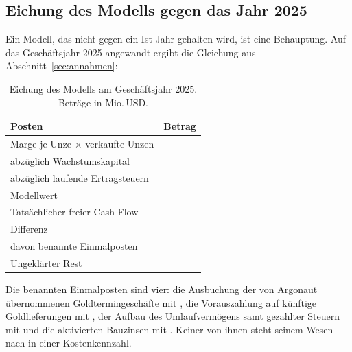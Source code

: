 \subsection{Eichung des Modells gegen das Jahr 2025}
\label{sec:eichung}

Ein Modell, das nicht gegen ein Ist-Jahr gehalten wird, ist eine Behauptung.
Auf das Gesch\"aftsjahr 2025 angewandt ergibt die Gleichung aus
Abschnitt~\ref{sec:annahmen}:

\begin{table}[htbp]
\centering
\caption{Eichung des Modells am Gesch\"aftsjahr 2025. Betr\"age in Mio.\,USD.}
\label{tab:floweichung}
\begin{tabular}{lr}
\toprule
Posten & Betrag\\
\midrule
Marge je Unze $\times$ verkaufte Unzen & \MioUSDexakt{\FlowEichMarge}\\
abz\"uglich Wachstumskapital & \MioUSDexakt{\FlowEichWachstum}\\
abz\"uglich laufende Ertragsteuern & \MioUSDexakt{\SteuerLaufend}\\
\midrule
Modellwert & \MioUSDexakt{\FlowEichModell}\\
Tats\"achlicher freier Cash-Flow & \MioUSDexakt{\FlowEichIst}\\
\midrule
Differenz & \MioUSDexakt{\FlowEichDifferenz}\\
davon benannte Einmalposten & \MioUSDexakt{\FlowEichErklaert}\\
\midrule
Ungekl\"arter Rest & \MioUSDexakt{\FlowEichRest}\\
\bottomrule
\end{tabular}
\end{table}

\FloatBarrier

Die benannten Einmalposten sind vier: die Ausbuchung der von Argonaut
\"ubernommenen Goldtermingesch\"afte mit \MioUSDexakt{\HedgeAusbuchung}, die
Vorauszahlung auf k\"unftige Goldlieferungen mit
\MioUSDexakt{\GoldVorauszahlung}, der Aufbau des Umlaufverm\"ogens samt
gezahlter Steuern mit \MioUSDexakt{\UmlaufvermoegenSteuern} und die
aktivierten Bauzinsen mit \MioUSDexakt{\ZinsAktiviert}.
Keiner von ihnen steht seinem Wesen nach in einer Kostenkennzahl.


